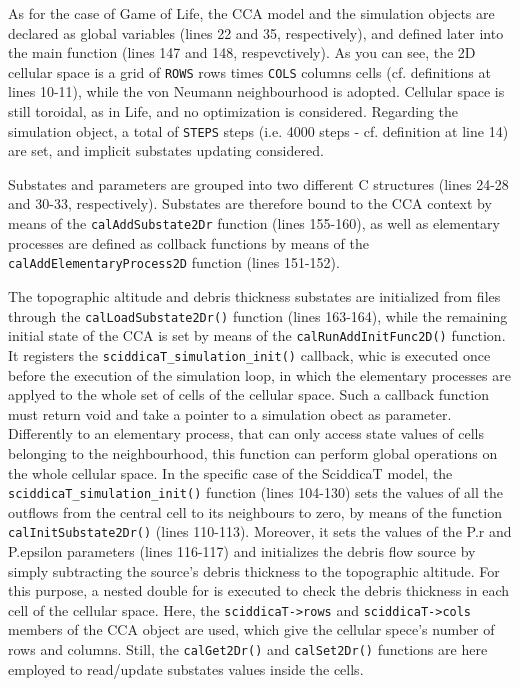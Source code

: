

As for the case of Game of Life, the CCA model and the simulation
objects are declared as global variables (lines 22 and 35,
respectively), and defined later into the main function (lines 147 and
148, respevctively). As you can see, the 2D cellular space is a grid
of \verb'ROWS' rows times \verb'COLS' columns cells (cf. definitions
at lines 10-11), while the von Neumann neighbourhood is
adopted. Cellular space is still toroidal, as in Life, and no
optimization is considered. Regarding the simulation object, a total
of \verb'STEPS' steps (i.e. 4000 steps - cf. definition at line 14)
are set, and implicit substates updating considered.

Substates and parameters are grouped into two different C structures
(lines 24-28 and 30-33, respectively). Substates are therefore bound to
the CCA context by means of the \verb'calAddSubstate2Dr' function
(lines 155-160), as well as elementary processes are defined as
collback functions by means of the \verb'calAddElementaryProcess2D'
function (lines 151-152).

The topographic altitude and debris thickness substates are
initialized from files through the \verb'calLoadSubstate2Dr()'
function (lines 163-164), while the remaining initial state of the CCA
is set by means of the \verb'calRunAddInitFunc2D()' function. It
registers the \verb'sciddicaT_simulation_init()' callback, whic is
executed once before the execution of the simulation loop, in which
the elementary processes are applyed to the whole set of cells of the
cellular space. Such a callback function must return void and take a
pointer to a simulation obect as parameter. Differently to an
elementary process, that can only access state values of cells
belonging to the neighbourhood, this function can perform global
operations on the whole cellular space. In the specific case of the
SciddicaT model, the \verb'sciddicaT_simulation_init()' function
(lines 104-130) sets the values of all the outflows from the central
cell to its neighbours to zero, by means of the function
\verb'calInitSubstate2Dr()' (lines 110-113). Moreover, it sets the
values of the P.r and P.epsilon parameters (lines 116-117) and
initializes the debris flow source by simply subtracting the source's
debris thickness to the topographic altitude. For this purpose, a
nested double for is executed to check the debris thickness in each
cell of the cellular space. Here, the \verb'sciddicaT->rows' and
\verb'sciddicaT->cols' members of the CCA object are used, which give
the cellular spece's number of rows and columns. Still, the
\verb'calGet2Dr()' and \verb'calSet2Dr()' functions are here employed
to read/update substates values inside the cells.


